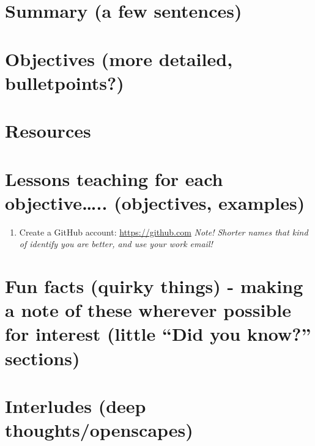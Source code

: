 \documentclass[]{book}
\providecommand{\tightlist}{%
  \setlength{\itemsep}{0pt}\setlength{\parskip}{0pt}}
\begin{document}
\hypertarget{summary-a-few-sentences-4}{%
\section{Summary (a few sentences)}\label{summary-a-few-sentences-4}}

\hypertarget{objectives-more-detailed-bulletpoints-4}{%
\section{Objectives (more detailed, bulletpoints?)}\label{objectives-more-detailed-bulletpoints-4}}

\hypertarget{resources-6}{%
\section{Resources}\label{resources-6}}

\hypertarget{lessons-teaching-for-each-objective..-objectives-examples-2}{%
\section{Lessons teaching for each objective\ldots{}.. (objectives, examples)}\label{lessons-teaching-for-each-objective..-objectives-examples-2}}

\begin{enumerate}
\def\labelenumi{\arabic{enumi}.}
\tightlist
\item
  Create a GitHub account: \url{https://github.com} \emph{Note! Shorter names that kind of identify you are better, and use your work email!}
\end{enumerate}

\hypertarget{fun-facts-quirky-things---making-a-note-of-these-wherever-possible-for-interest-little-did-you-know-sections-3}{%
\section{Fun facts (quirky things) - making a note of these wherever possible for interest (little ``Did you know?'' sections)}\label{fun-facts-quirky-things---making-a-note-of-these-wherever-possible-for-interest-little-did-you-know-sections-3}}

\hypertarget{interludes-deep-thoughtsopenscapes-6}{%
\section{Interludes (deep thoughts/openscapes)}\label{interludes-deep-thoughtsopenscapes-6}}
\end{document}
